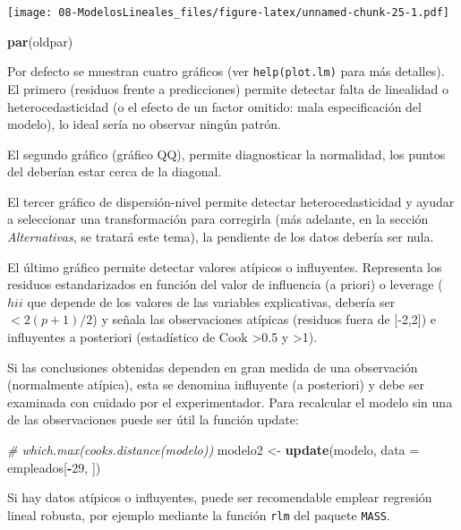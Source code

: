\documentclass[]{book}
\newenvironment{Shaded}{\begin{snugshade}}{\end{snugshade}}
\newcommand{\KeywordTok}[1]{\textcolor[rgb]{0.13,0.29,0.53}{\textbf{#1}}}
\newcommand{\DataTypeTok}[1]{\textcolor[rgb]{0.13,0.29,0.53}{#1}}
\newcommand{\DecValTok}[1]{\textcolor[rgb]{0.00,0.00,0.81}{#1}}
\newcommand{\StringTok}[1]{\textcolor[rgb]{0.31,0.60,0.02}{#1}}
\newcommand{\CommentTok}[1]{\textcolor[rgb]{0.56,0.35,0.01}{\textit{#1}}}
\newcommand{\OperatorTok}[1]{\textcolor[rgb]{0.81,0.36,0.00}{\textbf{#1}}}
\newcommand{\NormalTok}[1]{#1}
\begin{document}
\texttt{[image: 08-ModelosLineales\_files/figure-latex/unnamed-chunk-25-1.pdf]}

\begin{Shaded}
\begin{Highlighting}[]
\KeywordTok{par}\NormalTok{(oldpar)}
\end{Highlighting}
\end{Shaded}

Por defecto se muestran cuatro gráficos (ver \texttt{help(plot.lm)} para
más detalles). El primero (residuos frente a predicciones) permite
detectar falta de linealidad o heterocedasticidad (o el efecto de un
factor omitido: mala especificación del modelo), lo ideal sería no
observar ningún patrón.

El segundo gráfico (gráfico QQ), permite diagnosticar la normalidad, los
puntos del deberían estar cerca de la diagonal.

El tercer gráfico de dispersión-nivel permite detectar
heterocedasticidad y ayudar a seleccionar una transformación para
corregirla (más adelante, en la sección \emph{Alternativas}, se tratará
este tema), la pendiente de los datos debería ser nula.

El último gráfico permite detectar valores atípicos o influyentes.
Representa los residuos estandarizados en función del valor de
influencia (a priori) o leverage (\(hii\) que depende de los valores de
las variables explicativas, debería ser \(< 2(p+1)/2\)) y señala las
observaciones atípicas (residuos fuera de {[}-2,2{]}) e influyentes a
posteriori (estadístico de Cook \textgreater{}0.5 y \textgreater{}1).

Si las conclusiones obtenidas dependen en gran medida de una observación
(normalmente atípica), esta se denomina influyente (a posteriori) y debe
ser examinada con cuidado por el experimentador. Para recalcular el
modelo sin una de las observaciones puede ser útil la función update:

\begin{Shaded}
\begin{Highlighting}[]
\CommentTok{# which.max(cooks.distance(modelo))}
\NormalTok{modelo2 <-}\StringTok{ }\KeywordTok{update}\NormalTok{(modelo, }\DataTypeTok{data =}\NormalTok{ empleados[}\OperatorTok{-}\DecValTok{29}\NormalTok{, ])}
\end{Highlighting}
\end{Shaded}

Si hay datos atípicos o influyentes, puede ser recomendable emplear
regresión lineal robusta, por ejemplo mediante la función \texttt{rlm}
del paquete \texttt{MASS}.
\end{document}

